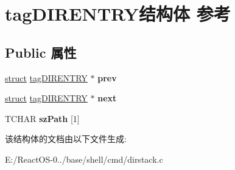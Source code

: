 \hypertarget{structtag_d_i_r_e_n_t_r_y}{}\section{tag\+D\+I\+R\+E\+N\+T\+R\+Y结构体 参考}
\label{structtag_d_i_r_e_n_t_r_y}
\subsection*{Public 属性}
\begin{DoxyCompactItemize}
\item 
\mbox{\label{structtag_d_i_r_e_n_t_r_y_ab0dd3ee078816d6f1db0684869574655}} 
\hyperlink{interfacestruct}{struct} \hyperlink{structtag_d_i_r_e_n_t_r_y}{tag\+D\+I\+R\+E\+N\+T\+RY} $\ast$ {\bfseries prev}
\item 
\mbox{\label{structtag_d_i_r_e_n_t_r_y_a6b894c823a512bc3856965ec842b91ea}} 
\hyperlink{interfacestruct}{struct} \hyperlink{structtag_d_i_r_e_n_t_r_y}{tag\+D\+I\+R\+E\+N\+T\+RY} $\ast$ {\bfseries next}
\item 
\mbox{\label{structtag_d_i_r_e_n_t_r_y_a2134face8dc5df9e8bcb02343d9ed614}} 
T\+C\+H\+AR {\bfseries sz\+Path} \mbox{[}1\mbox{]}
\end{DoxyCompactItemize}


该结构体的文档由以下文件生成\+:\begin{DoxyCompactItemize}
\item 
E\+:/\+React\+O\+S-\/0../base/shell/cmd/dirstack.\+c\end{DoxyCompactItemize}
